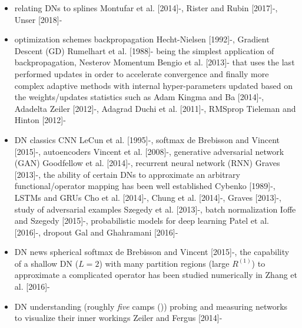 \documentclass{article}
\begin{document}
\begin{itemize}
	\item relating DNs to splines
		\subitem Montufar et al. [2014]-\cite{balestriero_mad_2018}, Rister and Rubin [2017]-\cite{balestriero_mad_2018}, Unser [2018]-\cite{balestriero_mad_2018}
	\item optimization schemes
		\subitem backpropagation Hecht-Nielsen [1992]-\cite{balestriero_mad_2018}, Gradient Descent (GD) Rumelhart et al. [1988]-\cite{balestriero_mad_2018} being the simplest application of backpropagation, Nesterov Momentum Bengio et al. [2013]-\cite{balestriero_mad_2018} that uses the last performed updates in order to accelerate convergence and finally more complex adaptive methods with internal hyper-parameters updated based on the weights/updates statistics such as Adam Kingma and Ba [2014]-\cite{balestriero_mad_2018}, Adadelta Zeiler [2012]-\cite{balestriero_mad_2018}, Adagrad Duchi et al. [2011]-\cite{balestriero_mad_2018}, RMSprop Tieleman and Hinton [2012]-\cite{balestriero_mad_2018}
	\item DN classics
		\subitem CNN LeCun et al. [1995]-\cite{balestriero_mad_2018}, softmax de Brebisson and Vincent [2015]-\cite{balestriero_mad_2018}, autoencoders Vincent et al. [2008]-\cite{balestriero_mad_2018}, generative adversarial network (GAN) Goodfellow et al. [2014]-\cite{balestriero_mad_2018}, recurrent neural network (RNN) Graves [2013]-\cite{balestriero_mad_2018}, the ability of certain DNs to approximate an arbitrary functional/operator mapping has been well established Cybenko [1989]-\cite{balestriero_mad_2018},  LSTMs and GRUs Cho et al. [2014]-\cite{balestriero_mad_2018}, Chung et al. [2014]-\cite{balestriero_mad_2018}, Graves [2013]-\cite{balestriero_mad_2018}, study of adversarial examples Szegedy et al. [2013]-\cite{balestriero_mad_2018}, batch normalization Ioffe and Szegedy [2015]-\cite{balestriero_mad_2018}, probabilistic models for deep learning Patel et al. [2016]-\cite{balestriero_mad_2018}, dropout Gal and Ghahramani [2016]-\cite{balestriero_mad_2018}
	\item DN news
		\subitem spherical softmax  de Brebisson and Vincent [2015]-\cite{balestriero_mad_2018}, the capability of a shallow DN ($L = 2$) with many partition regions (large $R^{(1)}$) to approximate a complicated operator has been studied numerically in Zhang et al. [2016]-\cite{balestriero_mad_2018}
	\item DN understanding (roughly \emph{five} camps (\cite{balestriero_mad_2018}))
		\subitem probing and measuring networks to visualize their inner workings Zeiler and Fergus [2014]-\cite{balestriero_mad_2018}

\end{itemize}
\end{document}
